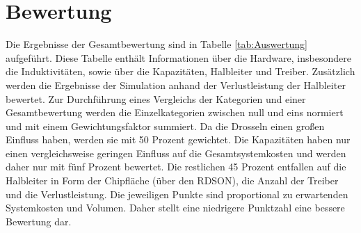 \section{Bewertung}
Die Ergebnisse der Gesamtbewertung sind in Tabelle \ref{tab:Auswertung} aufgeführt. Diese Tabelle enthält Informationen über die Hardware, insbesondere die Induktivitäten, sowie über die Kapazitäten, Halbleiter und Treiber. Zusätzlich werden die Ergebnisse der Simulation anhand der Verlustleistung der Halbleiter bewertet.  Zur Durchführung eines Vergleichs der Kategorien und einer Gesamtbewertung werden die Einzelkategorien zwischen null und eins normiert und mit einem Gewichtungsfaktor summiert. Da die Drosseln einen großen Einfluss haben, werden sie mit 50 Prozent gewichtet. Die Kapazitäten haben nur einen vergleichsweise geringen Einfluss auf die Gesamtsystemkosten und werden daher nur mit fünf Prozent bewertet. Die restlichen 45 Prozent entfallen auf die Halbleiter in Form der Chipfläche (über den RDSON), die Anzahl der Treiber und die Verlustleistung. Die jeweiligen Punkte sind proportional zu erwartenden Systemkosten und Volumen. Daher stellt eine niedrigere Punktzahl eine bessere Bewertung dar. \\
